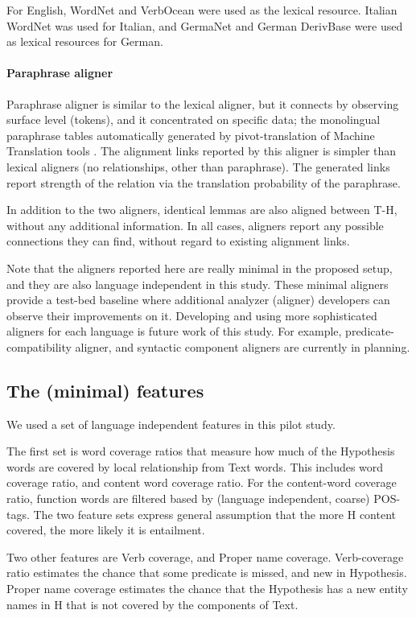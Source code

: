\documentclass[11pt,letterpaper]{article}
\begin{document}
For English, WordNet and VerbOcean were used as the lexical
resource. Italian WordNet \cite{} was used for Italian, and GermaNet
and German DerivBase \cite{} were used as lexical resources for
German.

\paragraph{Paraphrase aligner} Paraphrase aligner is similar to the lexical 
aligner, but it connects by observing surface level (tokens), and it  
concentrated on specific data; the monolingual paraphrase tables 
automatically generated by pivot-translation of Machine Translation
tools \cite{}. The  alignment links reported by this aligner is
simpler than lexical  aligners (no relationships, other than
paraphrase). The generated links report strength of the relation via
the translation probability of the paraphrase.   

In addition to the two aligners, identical lemmas are also aligned
between T-H, without any additional information. In all cases,
aligners report any possible connections they can find, without
regard to existing alignment links.  

Note that the aligners reported here are really minimal in the
proposed setup, and they are also language independent in this
study. These minimal aligners provide a test-bed baseline where
additional analyzer (aligner) developers can observe their 
improvements on it.  Developing and using more sophisticated aligners
for each language is future work of this study. For example,
predicate-compatibility aligner, and syntactic component aligners are
currently in planning.

\subsection{The (minimal) features} 
We used a set of language independent features in this pilot
study.

The first set is word coverage ratios that measure how much of the
Hypothesis words are covered by local relationship from Text
words. This includes word coverage ratio, and content word   coverage
ratio. For the content-word coverage ratio, function words are
filtered based by (language independent, coarse) POS-tags. The two
feature sets express general assumption that the more H content
covered, the more likely it is entailment.  

Two other features are Verb coverage, and Proper name
coverage. Verb-coverage ratio estimates the chance that some predicate
is missed, and new in Hypothesis. Proper name coverage estimates the
chance that the Hypothesis has a new entity names in H that is not
covered by the components of Text. 
\end{document}
